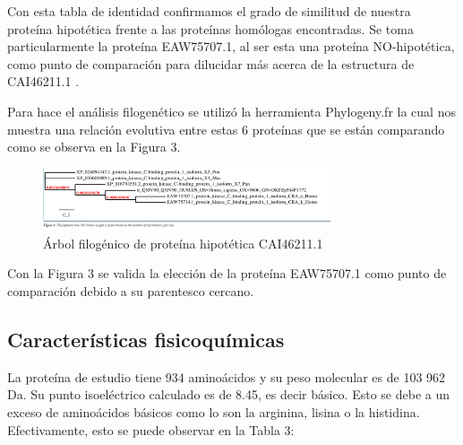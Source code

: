 \documentclass[journal,transmag]{IEEEtran}
\begin{document}
	Con esta tabla de identidad confirmamos el grado de similitud de nuestra proteína hipotética frente a las proteínas homólogas encontradas. Se toma particularmente la proteína EAW75707.1, al ser esta una proteína NO-hipotética, como punto de comparación para dilucidar más acerca de la estructura de CAI46211.1 . 

	Para hace el análisis filogenético se utilizó la herramienta Phylogeny.fr la cual nos muestra una relación evolutiva entre estas 6 proteínas que se están comparando como se observa en la Figura 3.

	
\begin{figure}[!h]
	\center
	\includegraphics[width=8.5cm]{imagenes/arbol3.png}
	\caption{Árbol filogénico de proteína hipotética CAI46211.1}
	\label{3}
\end{figure}
Con la Figura 3 se valida la elección de la proteína EAW75707.1 como punto de comparación debido a su parentesco cercano. 


\subsection{\textbf{ Características fisicoquímicas}}
La proteína de estudio tiene 934 aminoácidos y su peso molecular es de 103 962 Da. Su punto isoeléctrico calculado es de 8.45, es decir básico. Esto se debe a un exceso de aminoácidos básicos como lo son la arginina, lisina o la histidina. Efectivamente, esto se puede observar en la Tabla 3: 
\end{document}
